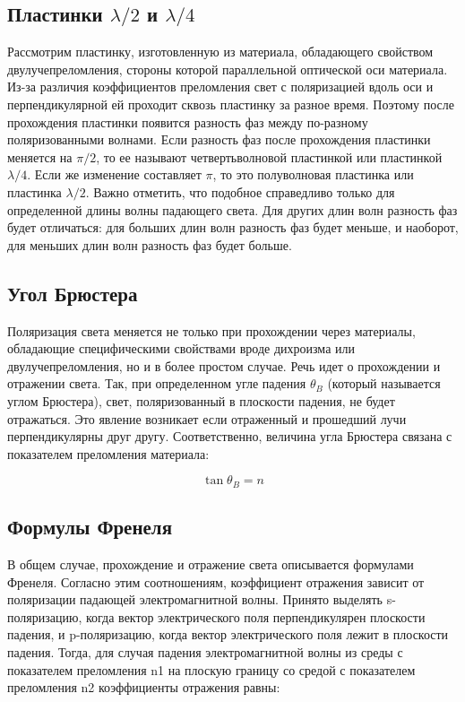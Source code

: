 \documentclass[a4paper,14pt]{extarticle}
\begin{document}
			\subsection{Пластинки $\lambda/2$ и $\lambda/4$}
			
			Рассмотрим пластинку, изготовленную из материала, обладающего свойством
			двулучепреломления, стороны которой параллельной оптической оси материала. Из-за
			различия коэффициентов преломления свет с поляризацией вдоль оси и
			перпендикулярной ей проходит сквозь пластинку за разное время. Поэтому после
			прохождения пластинки появится разность фаз между по-разному поляризованными
			волнами. Если разность фаз после прохождения пластинки меняется на $\pi/2$, то ее
			называют четвертьволновой пластинкой или пластинкой $\lambda/4$. Если же изменение
			составляет $\pi$, то это полуволновая пластинка или пластинка $\lambda/2$. Важно отметить, что
			подобное справедливо только для определенной длины волны падающего света. Для
			других длин волн разность фаз будет отличаться: для больших длин волн разность фаз
			будет меньше, и наоборот, для меньших длин волн разность фаз будет больше.
			
			\subsection{Угол Брюстера}
			Поляризация света меняется не только при прохождении через материалы, обладающие
			специфическими свойствами вроде дихроизма или двулучепреломления, но и в более
			простом случае. Речь идет о прохождении и отражении света. Так, при определенном угле
			падения $\theta_B$ (который называется углом Брюстера), свет, поляризованный в плоскости
			падения, не будет отражаться. Это явление возникает если отраженный и прошедший
			лучи перпендикулярны друг другу. Соответственно, величина угла Брюстера связана с
			показателем преломления материала:
			
			\begin{equation}
			\tan{\theta_B} = n
			\end{equation}
			
			\subsection{Формулы Френеля}
			
			В общем случае, прохождение и отражение света описывается формулами Френеля.
			Согласно этим соотношениям, коэффициент отражения зависит от поляризации падающей
			электромагнитной волны. Принято выделять s-поляризацию, когда вектор электрического
			поля перпендикулярен плоскости падения, и p-поляризацию, когда вектор электрического
			поля лежит в плоскости падения. Тогда, для случая падения электромагнитной волны из
			среды с показателем преломления n1 на плоскую границу со средой с показателем
			преломления n2 коэффициенты отражения равны:
			
\end{document}
